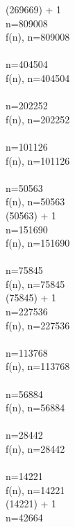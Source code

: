 \documentclass{article}
\begin{document}
 (269669) + 1
 \\ 
 \Rightarrow n=809008
 \\[3mm] 
f(n), n=809008
 \\ 
 \Rightarrow {} 
 \\ 
 \Rightarrow n=404504
 \\[3mm] 
f(n), n=404504
 \\ 
 \Rightarrow {} 
 \\ 
 \Rightarrow n=202252
 \\[3mm] 
f(n), n=202252
 \\ 
 \Rightarrow {} 
 \\ 
 \Rightarrow n=101126
 \\[3mm] 
f(n), n=101126
 \\ 
 \Rightarrow {} 
 \\ 
 \Rightarrow n=50563
 \\[3mm] 
f(n), n=50563
 \\ 
 (50563) + 1
 \\ 
 \Rightarrow n=151690
 \\[3mm] 
f(n), n=151690
 \\ 
 \Rightarrow {} 
 \\ 
 \Rightarrow n=75845
 \\[3mm] 
f(n), n=75845
 \\ 
 (75845) + 1
 \\ 
 \Rightarrow n=227536
 \\[3mm] 
f(n), n=227536
 \\ 
 \Rightarrow {} 
 \\ 
 \Rightarrow n=113768
 \\[3mm] 
f(n), n=113768
 \\ 
 \Rightarrow {} 
 \\ 
 \Rightarrow n=56884
 \\[3mm] 
f(n), n=56884
 \\ 
 \Rightarrow {} 
 \\ 
 \Rightarrow n=28442
 \\[3mm] 
f(n), n=28442
 \\ 
 \Rightarrow {} 
 \\ 
 \Rightarrow n=14221
 \\[3mm] 
f(n), n=14221
 \\ 
 (14221) + 1
 \\ 
 \Rightarrow n=42664
 \\[3mm] 
\end{document}
